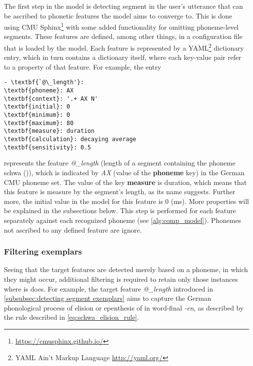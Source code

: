 The first step in the model is detecting segment in the user's utterance that can be ascribed to phonetic features the model aims to converge to.
This is done using CMU Sphinx\footnote{\url{https://cmusphinx.github.io/}} with some added functionality for omitting phoneme-level segments.
These features are defined, among other things, in a configuration file that is loaded by the model.
Each feature is represented by a YAML\footnote{YAML Ain't Markup Language \url{http://yaml.org/}} dictionary entry, which in turn contains a dictionary itself, where each key-value pair refer to a property of that feature.
For example, the entry

\begin{Verbatim}[tabsize=4, commandchars=\\\{\}]
- \textbf{`@\_length'}:
\textbf{phoneme}: AX
\textbf{context}: '.+ AX N'
\textbf{initial}: 0
\textbf{minimum}: 0
\textbf{maximum}: 80
\textbf{measure}: duration
\textbf{calculation}: decaying average
\textbf{sensitivity}: 0.5
\end{Verbatim}
\noindent
represents the feature \textit{@\_length} (length of a segment containing the phoneme schwa ()), which is indicated by \textit{AX} (value of the \textbf{phoneme} key) in the German CMU phoneme set.
The value of the key \textbf{measure} is duration, which means that this feature is measure by the segment's length, as its name suggests.
Further more, the initial value in the model for this feature is 0 (\si{\milli\second}).
More properties will be explained in the subsections below.
This step is performed for each feature separately against each recognized phoneme (see \cref{alg:comp_model}).
Phonemes not ascribed to any defined feature are ignore.

\subsubsection{Filtering exemplars}
\label{subsubsec:filtering_exemplars}

Seeing that the target features are detected merely based on a phoneme, in which they might occur, additional filtering is required to retain only those instances where is does.
For example, the target feature \textit{@\_length} introduced in \cref{subsubsec:detecting segment exemplars} aims to capture the German phonological process of elision or epenthesis of  in word-final \textit{-en}, as described by the rule described in \cref{eq:schwa_elision_rule}.
%

